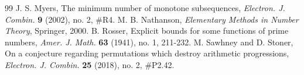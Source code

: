 \documentclass[10pt,a4paper]{amsart}
\begin{document}
\begin{thebibliography}{99}
 J. S. Myers, The minimum number of monotone subsequences, \textit{Electron. J. Combin.} \textbf{9} (2002), no. 2, \#R4.
 M. B. Nathanson, \textit{Elementary Methods in Number Theory}, Springer, 2000.
 B. Rosser, Explicit bounds for some functions of prime numbers, \textit{Amer. J. Math.} \textbf{63} (1941), no. 1, 211-232.
 M. Sawhney and D. Stoner, On a conjecture regarding permutations which destroy arithmetic progressions, \textit{Electron. J. Combin.} \textbf{25} (2018), no. 2, \#P2.42.
\end{thebibliography}
\end{document}

